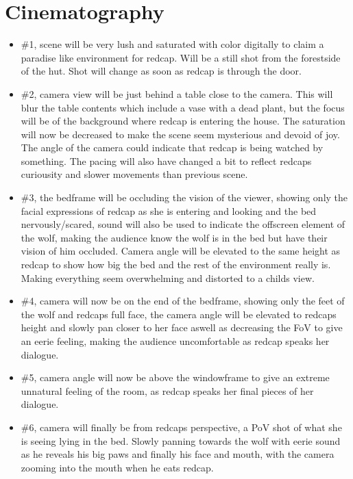 \documentclass{article}
\begin{document}
\section{Cinematography}
\begin{itemize}
    \item \#1, scene will be very lush and saturated with color digitally to claim a paradise like environment for redcap. Will be a still shot from the forestside of the hut. Shot will change as soon as redcap is through the door.
    \item \#2, camera view will be just behind a table close to the camera. This will blur the table contents which include a vase with a dead plant, but the focus will be of the background where redcap is entering the house. The saturation will now be decreased to make the scene seem mysterious and devoid of joy. The angle of the camera could indicate that redcap is being watched by something. The pacing will also have changed a bit to reflect redcaps curiousity and slower movements than previous scene.
    \item \#3, the bedframe will be occluding the vision of the viewer, showing only the facial expressions of redcap as she is entering and looking and the bed nervously/scared, sound will also be used to indicate the offscreen element of the wolf, making the audience know the wolf is in the bed but have their vision of him occluded. Camera angle will be elevated to the same height as redcap to show how big the bed and the rest of the environment really is. Making everything seem overwhelming and distorted to a childs view.
    \item \#4, camera will now be on the end of the bedframe, showing only the feet of the wolf and redcaps full face, the camera angle will be elevated to redcaps height and slowly pan closer to her face aswell as decreasing the FoV to give an eerie feeling, making the audience uncomfortable as redcap speaks her dialogue.
    \item \#5, camera angle will now be above the windowframe to give an extreme unnatural feeling of the room, as redcap speaks her final pieces of her dialogue.
    \item \#6, camera will finally be from redcaps perspective, a PoV shot of what she is seeing lying in the bed. Slowly panning towards the wolf with eerie sound as he reveals his big paws and finally his face and mouth, with the camera zooming into the mouth when he eats redcap.
\end{itemize}
\end{document}
